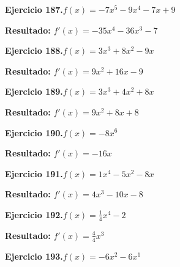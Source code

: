 \documentclass[10pt,a4paper]{article}
\begin{document}
\newpage
\begin{ejbox}
\textbf{Ejercicio 187.}\quad $f(x) = -7x^{5} -9x^{4} -7x +9$
\end{ejbox}

\begin{solbox}
\textbf{Resultado:} \(\displaystyle f'(x) = -35x^{4} -36x^{3} -7\)
\end{solbox}

\begin{ejbox}
\textbf{Ejercicio 188.}\quad $f(x) = 3x^{3} +8x^2 -9x$
\end{ejbox}

\begin{solbox}
\textbf{Resultado:} \(\displaystyle f'(x) = 9x^{2} +16x -9\)
\end{solbox}

\begin{ejbox}
\textbf{Ejercicio 189.}\quad $f(x) = 3x^3 +4x^2 +8x$
\end{ejbox}

\begin{solbox}
\textbf{Resultado:} \(\displaystyle f'(x) = 9x^2 +8x +8\)
\end{solbox}

\newpage
\begin{ejbox}
\textbf{Ejercicio 190.}\quad $f(x) = -8x^{6}$
\end{ejbox}

\begin{solbox}
\textbf{Resultado:} \(\displaystyle f'(x) = -16x\)
\end{solbox}

\begin{ejbox}
\textbf{Ejercicio 191.}\quad $f(x) = 1x^{4} -5x^2 -8x$
\end{ejbox}

\begin{solbox}
\textbf{Resultado:} \(\displaystyle f'(x) = 4x^{3} -10x -8\)
\end{solbox}

\begin{ejbox}
\textbf{Ejercicio 192.}\quad $f(x) = \frac{1}{4}x^{4} -2$
\end{ejbox}

\begin{solbox}
\textbf{Resultado:} \(\displaystyle f'(x) = \frac{4}{4}x^{3}\)
\end{solbox}

\newpage
\begin{ejbox}
\textbf{Ejercicio 193.}\quad $f(x) = -6x^{2} -6x^{1}$
\end{ejbox}
\end{document}
